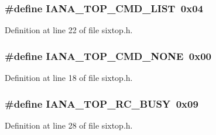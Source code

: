 \subsubsection[{\texorpdfstring{I\+A\+N\+A\+\_\+6\+T\+O\+P\+\_\+\+C\+M\+D\+\_\+\+L\+I\+ST}{IANA_6TOP_CMD_LIST}}]{\setlength{\rightskip}{0pt plus 5cm}\#define I\+A\+N\+A\+\_\+T\+O\+P\+\_\+\+C\+M\+D\+\_\+\+L\+I\+ST~0x04}\hypertarget{group__sixtop_ga9bc18cb88810c338e62221426255d2b5}{}\label{group__sixtop_ga9bc18cb88810c338e62221426255d2b5}


Definition at line 22 of file sixtop.\+h.

\subsubsection[{\texorpdfstring{I\+A\+N\+A\+\_\+6\+T\+O\+P\+\_\+\+C\+M\+D\+\_\+\+N\+O\+NE}{IANA_6TOP_CMD_NONE}}]{\setlength{\rightskip}{0pt plus 5cm}\#define I\+A\+N\+A\+\_\+T\+O\+P\+\_\+\+C\+M\+D\+\_\+\+N\+O\+NE~0x00}\hypertarget{group__sixtop_gabdc29537673b19bb583c8ccb3e3330c6}{}\label{group__sixtop_gabdc29537673b19bb583c8ccb3e3330c6}


Definition at line 18 of file sixtop.\+h.

\subsubsection[{\texorpdfstring{I\+A\+N\+A\+\_\+6\+T\+O\+P\+\_\+\+R\+C\+\_\+\+B\+U\+SY}{IANA_6TOP_RC_BUSY}}]{\setlength{\rightskip}{0pt plus 5cm}\#define I\+A\+N\+A\+\_\+T\+O\+P\+\_\+\+R\+C\+\_\+\+B\+U\+SY~0x09}\hypertarget{group__sixtop_ga08b4fb07b78fd672a46f02e09d24b1a7}{}\label{group__sixtop_ga08b4fb07b78fd672a46f02e09d24b1a7}


Definition at line 28 of file sixtop.\+h.

